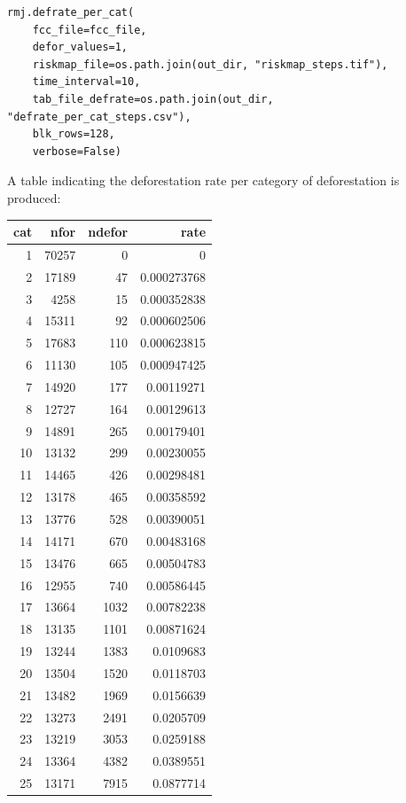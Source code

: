 \documentclass[paper=a4, 12pt, DIV=12]{scrartcl}
\begin{document}
\begin{verbatim}
rmj.defrate_per_cat(
    fcc_file=fcc_file,
    defor_values=1,
    riskmap_file=os.path.join(out_dir, "riskmap_steps.tif"),
    time_interval=10,
    tab_file_defrate=os.path.join(out_dir, "defrate_per_cat_steps.csv"),
    blk_rows=128,
    verbose=False)
\end{verbatim}

A table indicating the deforestation rate per category of deforestation is produced:

\begin{center}
\begin{tabular}{rrrr}
cat & nfor & ndefor & rate\\
\hline
1 & 70257 & 0 & 0\\
2 & 17189 & 47 & 0.000273768\\
3 & 4258 & 15 & 0.000352838\\
4 & 15311 & 92 & 0.000602506\\
5 & 17683 & 110 & 0.000623815\\
6 & 11130 & 105 & 0.000947425\\
7 & 14920 & 177 & 0.00119271\\
8 & 12727 & 164 & 0.00129613\\
9 & 14891 & 265 & 0.00179401\\
10 & 13132 & 299 & 0.00230055\\
11 & 14465 & 426 & 0.00298481\\
12 & 13178 & 465 & 0.00358592\\
13 & 13776 & 528 & 0.00390051\\
14 & 14171 & 670 & 0.00483168\\
15 & 13476 & 665 & 0.00504783\\
16 & 12955 & 740 & 0.00586445\\
17 & 13664 & 1032 & 0.00782238\\
18 & 13135 & 1101 & 0.00871624\\
19 & 13244 & 1383 & 0.0109683\\
20 & 13504 & 1520 & 0.0118703\\
21 & 13482 & 1969 & 0.0156639\\
22 & 13273 & 2491 & 0.0205709\\
23 & 13219 & 3053 & 0.0259188\\
24 & 13364 & 4382 & 0.0389551\\
25 & 13171 & 7915 & 0.0877714\\
\end{tabular}
\end{center}
\end{document}
